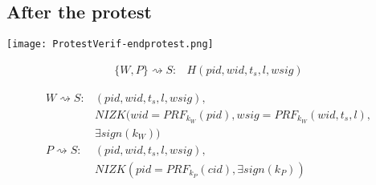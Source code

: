 \begin{frame}
  \centering
\end{frame}

\subsection{After the protest}

\begin{frame}
  \centering
  \texttt{[image: ProtestVerif-endprotest.png]}
\end{frame}

\begin{frame}
  \begin{minipage}{\linewidth}
    \begin{align*}
      \{W, P\}\rightsquigarrow S\colon & H(pid, wid, t_s, l, wsig)
    \end{align*}
  \end{minipage}
\end{frame}

\begin{frame}
  \begin{minipage}{\linewidth}
    \begin{align*}
      W\rightsquigarrow S\colon & (pid, wid, t_s, l, wsig),\\
        & NIZK(wid = PRF_{k_W}(pid), wsig = PRF_{k_W}(wid, t_s, l),\\
        & \exists sign(k_W)) \\
        P\rightsquigarrow S\colon & (pid, wid, t_s, l, wsig),\\
        & NIZK(pid = PRF_{k_P}(cid), \exists sign(k_P))
    \end{align*}
  \end{minipage}
\end{frame}


